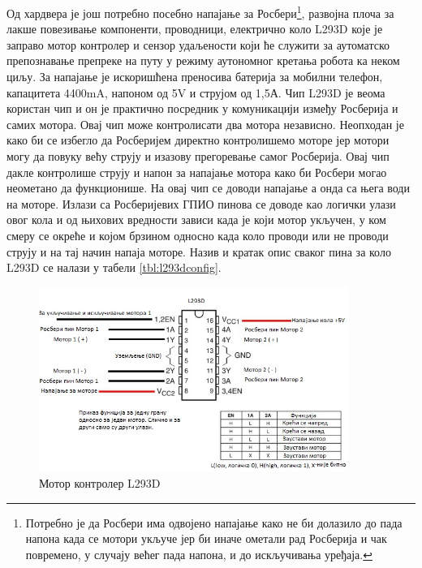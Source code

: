 \documentclass[12pt,oneside]{memoir}
\theoremstyle{remark}
\begin{document}
Од хардвера је још потребно посебно напајање за Росбери\footnote{Потребно је да Росбери има одвојено напајање како не би долазило до пада напона када се мотори укључе јер би иначе ометали рад Росберија и чак повремено, у случају већег пада напона, и до искључивања уређаја.}, развојна плоча за лакше повезивање компоненти, проводници, електрично коло L293D које је заправо мотор контролер и сензор удаљености који ће служити за аутоматско препознавање препреке на путу у режиму аутономног кретања робота ка неком циљу. За напајање је искоришћена преносива батерија за мобилни телефон, капацитета 4400mA, напоном од 5V и струјом од 1,5А. Чип L293D је веома користан чип и он је практично посредник у комуникацији између Росберија и самих мотора. Овај чип може контролисати два мотора независно. Неопходан је како би се избегло да Росберијем директно контролишемо моторе јер мотори могу да повуку већу струју и изазову прегоревање самог Росберија. Овај чип дакле контролише струју и напон за напајање мотора како би Росбери могао неометано да функционише. На овај чип се доводи напајање а онда са њега води на моторе. Излази са Росберијевих ГПИО пинова се доводе као логички улази овог кола и од њихових вредности зависи када је који мотор укључен, у ком смеру се окреће и којом брзином односно када коло проводи или не проводи струју и на тај начин напаја моторе. Назив и кратак опис сваког пина за коло L293D се налази у табели \ref{tbl:l293dconfig}.


\begin{figure}[!ht]
\centering
\includegraphics[width=0.9\textwidth]{slike/shemal293d.jpg}
\caption{Мотор контролер L293D}
\label{fig:l293d}
\end{figure}
\end{document}
